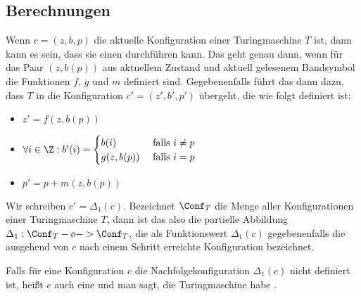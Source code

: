 \Tut\subsection{Berechnungen}
\label{subsec:berechnungen}

Wenn $c=(z,b,p)$ die aktuelle Konfiguration einer Turingmaschine $T$
ist, dann kann es sein, dass sie einen  durchführen kann. Das
geht genau dann, wenn für das Paar $(z,b(p))$ aus aktuellem Zustand
und aktuell gelesenem Bandsymbol die Funktionen $f$, $g$ und $m$
definiert sind. Gegebenenfalls führt das dann dazu, dass $T$ in die
Konfiguration $c'=(z',b',p')$ übergeht, die wie folgt definiert ist:
\begin{itemize}
\item $z' = f(z,b(p))$
\item $\forall i\in \Z: b'(i) =
  \begin{cases}
    b(i) & \text{ falls } i\not=p \\
    g(z,b(p)) & \text{ falls } i=p
  \end{cases}$
\item $p' = p + m(z,b(p))$
\end{itemize}
%
Wir schreiben $c'= \Delta_1(c)$. Bezeichnet $\Conf_T$ die Menge aller
Konfigurationen einer Turingmaschine $T$, dann ist das also die
partielle Abbildung $\Delta_1:\Conf_T -o-> \Conf_T$, die als
Funktionswert $\Delta_1(c)$ gegebenenfalls die ausgehend von $c$ nach
einem Schritt erreichte Konfiguration bezeichnet.

Falls für eine Konfiguration $c$ die Nachfolgekonfiguration
$\Delta_1(c)$ nicht definiert ist, heißt $c$ auch eine
 und man sagt, die
Turingmaschine habe .

